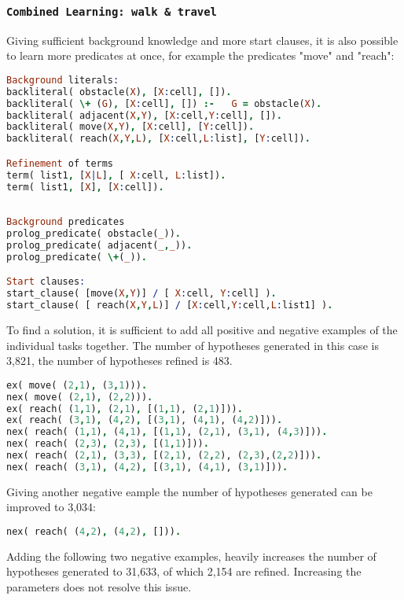 \subsubsection{\texttt{Combined Learning: walk \& travel}}
Giving sufficient background knowledge and more start clauses, it is also possible to learn more predicates at once, for example the predicates "move" and "reach":
\begin{lstlisting}[label={lst:comb}, language=Prolog, caption=Combined learning of "move" \& "reach", belowcaptionskip=1cm]
Background literals:
backliteral( obstacle(X), [X:cell], []).
backliteral( \+ (G), [X:cell], []) :- 	G = obstacle(X).
backliteral( adjacent(X,Y), [X:cell,Y:cell], []).
backliteral( move(X,Y), [X:cell], [Y:cell]).
backliteral( reach(X,Y,L), [X:cell,L:list], [Y:cell]).

Refinement of terms
term( list1, [X|L], [ X:cell, L:list]).
term( list1, [X], [X:cell]).
	
		
Background predicates
prolog_predicate( obstacle(_)).
prolog_predicate( adjacent(_,_)).
prolog_predicate( \+(_)).       

Start clauses:
start_clause( [move(X,Y)] / [ X:cell, Y:cell] ).
start_clause( [ reach(X,Y,L)] / [X:cell,Y:cell,L:list1] ).  
\end{lstlisting}
To find a solution, it is sufficient to add all positive and negative examples of the individual tasks together. The number of hypotheses generated in this case is 3,821, the number of hypotheses refined is 483.
\begin{lstlisting}[label={lst:comb_ex}, language=Prolog, caption=Examples for combined learning of "move" \& "reach", belowcaptionskip=1cm]
ex( move( (2,1), (3,1))).
nex( move( (2,1), (2,2))). 
ex( reach( (1,1), (2,1), [(1,1), (2,1)])). 
ex( reach( (3,1), (4,2), [(3,1), (4,1), (4,2)])).
nex( reach( (1,1), (4,1), [(1,1), (2,1), (3,1), (4,3)])).
nex( reach( (2,3), (2,3), [(1,1)])).
nex( reach( (2,1), (3,3), [(2,1), (2,2), (2,3),(2,2)])).
nex( reach( (3,1), (4,2), [(3,1), (4,1), (3,1)])).
\end{lstlisting}
Giving another negative eample the number of hypotheses generated can be improved to 3,034:
\begin{lstlisting}[label={lst:comb_neg}, language=Prolog, caption=Additional example for combined learning of "move" \& "reach", belowcaptionskip=1cm]
nex( reach( (4,2), (4,2), [])).
\end{lstlisting}
Adding the following two negative examples, heavily increases the number of hypotheses generated to 31,633, of which 2,154 are refined. Increasing the parameters does not resolve this issue.
